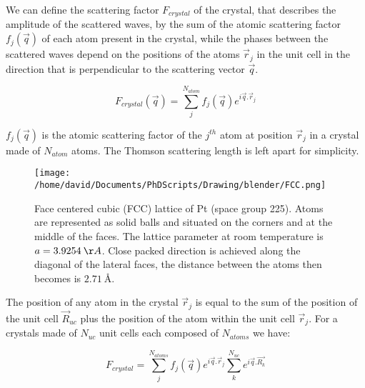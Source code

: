 We can define the scattering factor $F_{crystal}$ of the crystal, that describes the amplitude of the scattered waves, by the sum of the atomic scattering factor $f_j(\vec{q})$ of each atom present in the crystal, while the phases between the scattered waves depend on the positions of the atoms $\vec{r}_j$ in the unit cell in the direction that is perpendicular to the scattering vector $\vec{q}$.

\begin{equation}
    F_{crystal}(\vec{q}) = \sum_j^{N_{atom}} f_j(\vec{q}) e^{i\vec{q}.\vec{r}_j}
\end{equation}

$f_j(\vec{q})$ is the atomic scattering factor of the $j^{th}$ atom at position $\vec{r}_j$ in a crystal made of $N_{atom}$ atoms.
The Thomson scattering length is left apart for simplicity.

\begin{figure}[!htb]
    \centering
    \texttt{[image: /home/david/Documents/PhDScripts/Drawing/blender/FCC.png]}
    \caption{Face centered cubic (FCC) lattice of Pt (space group 225). Atoms are represented as solid balls and situated on the corners and at the middle of the faces. The lattice parameter at room temperature is $a = 3.9254 \:\AA$. Close packed direction is achieved along the diagonal of the lateral faces, the distance between the atoms then becomes is $2.71 \:\si{\angstrom}.$}
    \label{fig:fcc}
\end{figure}

The position of any atom in the crystal $\vec{r}_j$ is equal to the sum of the position of the unit cell $\vec{R}_{uc}$ plus the position of the atom within the unit cell $\vec{r}_j$.
For a crystals made of $N_{uc}$ unit cells each composed of $N_{atoms}$ we have:

\begin{equation}
    F_{crystal} = \sum_j^{N_{atoms}} f_j(\vec{q}) e^{i\vec{q}.\vec{r}_j} \sum_k^{N_{uc}} e^{i\vec{q}.\vec{R_k}}
    \label{eq:Fcrystal}
\end{equation}


